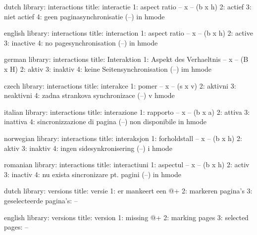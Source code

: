 


\startmessages  dutch  library: interactions
  title: interactie
      1: aspect ratio -- x -- (b x h)
      2: actief
      3: niet actief
      4: geen paginasynchronisatie (--) in hmode
\stopmessages

\startmessages  english  library: interactions
  title: interaction
      1: aspect ratio -- x -- (b x h)
      2: active
      3: inactive
      4: no pagesynchronisation (--) in hmode
\stopmessages

\startmessages  german  library: interactions
  title: Interaktion
      1: Aspekt des Verhaeltnis -- x -- (B x H)
      2: aktiv
      3: inaktiv
      4: keine Seitensynchronisation (--) im hmode
\stopmessages

\startmessages  czech  library: interactions
  title: interakce
      1: pomer -- x -- (s x v)
      2: aktivni
      3: neaktivni
      4: zadna strankova synchronizace (--) v hmode
\stopmessages

\startmessages  italian  library: interactions
  title: interazione
      1: rapporto -- x -- (b x a)
      2: attiva
      3: inattiva
      4: sincronizzazione di pagina (--) non disponibile in hmode
\stopmessages

\startmessages  norwegian  library: interactions
  title: interaksjon
      1: forholdstall -- x -- (b x h)
      2: aktiv
      3: inaktiv
      4: ingen sidesynkronisering (--) i hmode
\stopmessages

\startmessages  romanian  library: interactions
  title: interactiuni
      1: aspectul -- x -- (b x h)
      2: activ
      3: inactiv
      4: nu exista sincronizare pt. pagini (--) in hmode
\stopmessages

\startmessages  dutch  library: versions
  title: versie
      1: er mankeert een @+
      2: markeren pagina's
      3: geselecteerde pagina's: --
\stopmessages

\startmessages  english  library: versions
  title: version
      1: missing @+
      2: marking pages
      3: selected pages: --
\stopmessages

